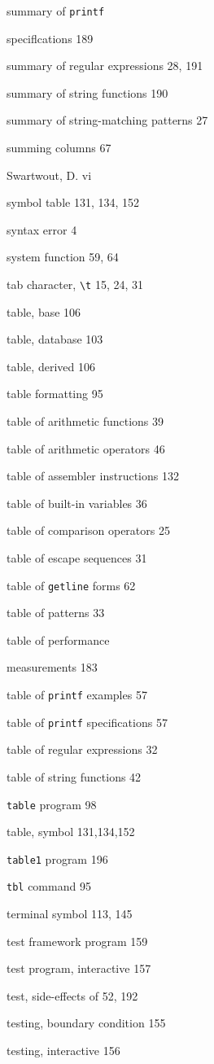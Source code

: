 \begin{multicols}{2}
summary of \verb'printf'

speciflcations 189

summary of regular expressions 28, 191

summary of string functions 190

summary of string-matching patterns 27

summing columns 67

Swartwout, D. vi

symbol table 131, 134, 152

syntax error 4

system function 59, 64

tab character, \verb'\t' 15, 24, 31

table, base 106

table, database 103

table, derived 106

table formatting 95

table of arithmetic functions 39

table of arithmetic operators 46

table of assembler instructions 132

table of built-in variables 36

table of comparison operators 25

table of escape sequences 31

table of \verb'getline' forms 62

table of patterns 33

table of performance

measurements 183

table of \verb'printf' examples 57

table of \verb'printf' specifications 57

table of regular expressions 32

table of string functions 42

\verb'table' program 98

table, symbol 131,134,152

\verb'table1' program 196

\verb'tbl' command 95

terminal symbol 113, 145

test framework program 159

test program, interactive 157

test, side-effects of 52, 192

testing, boundary condition 155

testing, interactive 156


\end{multicols}
